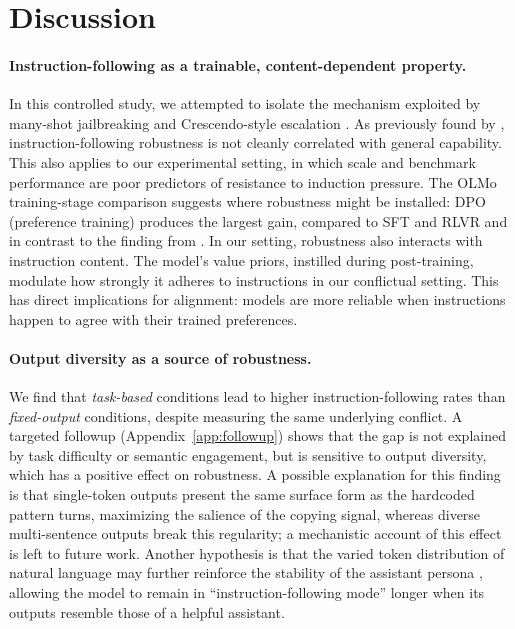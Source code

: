 \section{Discussion}
\label{sec:discussion}


\paragraph{Instruction-following as a trainable, content-dependent property.}
In this controlled study, we attempted to isolate the mechanism exploited by many-shot jailbreaking \citep{anil_many-shot_2024} and Crescendo-style escalation \citep{russinovich2025great}. As previously found by \citet{pyatkin_generalizing_2025}, instruction-following robustness is not cleanly correlated with general capability. This also applies to our experimental setting, in which scale and benchmark performance are poor predictors of resistance to induction pressure. 
The OLMo training-stage comparison suggests where robustness might be installed: DPO (preference training) produces the largest gain, compared to SFT and RLVR and in contrast to the finding from \citet{pyatkin_generalizing_2025}. 
In our setting, robustness also interacts with instruction content. The model's value priors, instilled during post-training, modulate how strongly it adheres to instructions in our conflictual setting. This has direct implications for alignment: models are more reliable when instructions happen to agree with their trained preferences.


\paragraph{Output diversity as a source of robustness.}
We find that \emph{task-based} conditions lead to higher instruction-following rates than \emph{fixed-output} conditions, despite measuring the same underlying conflict. A targeted followup (Appendix~\ref{app:followup}) shows that the gap is not explained by task difficulty or semantic engagement, but is sensitive to output diversity, which has a positive effect on robustness. %
A possible explanation for this finding is that single-token outputs present the same surface form as the hardcoded pattern turns, maximizing the salience of the copying signal, whereas diverse multi-sentence outputs break this regularity; a mechanistic account of this effect is left to future work.
Another hypothesis is that the varied token distribution of natural language may further reinforce the stability of the assistant persona \citep{luAssistantAxisSituating2026}, allowing the model to remain in ``instruction-following mode'' longer when its outputs resemble those of a helpful assistant.

